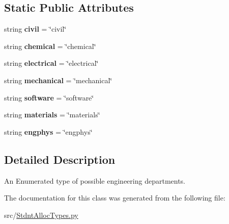 \subsection*{Static Public Attributes}
\begin{DoxyCompactItemize}
\item 
\mbox{\label{class_stdnt_alloc_types_1_1_dept_t_a578b321a2301c134046d1b7a435840f4}} 
string {\bfseries civil} = \char`\"{}civil\char`\"{}
\item 
\mbox{\label{class_stdnt_alloc_types_1_1_dept_t_a00f9d4c89adaac8cb29fb9b1fb49c6b6}} 
string {\bfseries chemical} = \char`\"{}chemical\char`\"{}
\item 
\mbox{\label{class_stdnt_alloc_types_1_1_dept_t_a1073a0bacdf2538b83b6cc649d1281e5}} 
string {\bfseries electrical} = \char`\"{}electrical\char`\"{}
\item 
\mbox{\label{class_stdnt_alloc_types_1_1_dept_t_a8f0286f2c8bdfa90f2e96d3968872bc5}} 
string {\bfseries mechanical} = \char`\"{}mechanical\char`\"{}
\item 
\mbox{\label{class_stdnt_alloc_types_1_1_dept_t_a321e6a6c4a7f6177ab04d66966666405}} 
string {\bfseries software} = \char`\"{}software\char`\"{}
\item 
\mbox{\label{class_stdnt_alloc_types_1_1_dept_t_a89e5ca2915bbade29c54a4cb3c5d80a1}} 
string {\bfseries materials} = \char`\"{}materials\char`\"{}
\item 
\mbox{\label{class_stdnt_alloc_types_1_1_dept_t_a150e6c3b5f94d1fb6b70be0c4f8848aa}} 
string {\bfseries engphys} = \char`\"{}engphys\char`\"{}
\end{DoxyCompactItemize}


\subsection{Detailed Description}
An Enumerated type of possible engineering departments. 

The documentation for this class was generated from the following file\+:\begin{DoxyCompactItemize}
\item 
src/\hyperlink{_stdnt_alloc_types_8py}{Stdnt\+Alloc\+Types.\+py}\end{DoxyCompactItemize}
